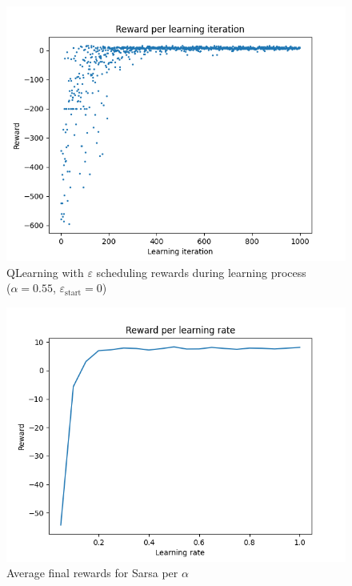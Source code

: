 \documentclass[11pt]{article}
\def\scheduleeps{0}
\def\schedulealph{0.55}
\begin{document}
\begin{figure}[H]
	\centering
	\includegraphics[width=12cm]{../figures/part_2/learning_reward_optimized_qlearning_eps_schedule.png}
	\caption{QLearning with $\varepsilon$ scheduling rewards during learning process\\($\alpha = \schedulealph$, $\varepsilon_{\text{start}} = \scheduleeps$)}
	\label{fig:qlearning_eps_schedule_opti_reward}
\end{figure}

\begin{figure}[H]
	\centering
	\includegraphics[width=12cm]{../figures/part_3/learning_reward_sarsa_alpha_search.png}
	\caption{Average final rewards for Sarsa per $\alpha$}
	\label{fig:sarsa_alph_search}
\end{figure}
\end{document}
